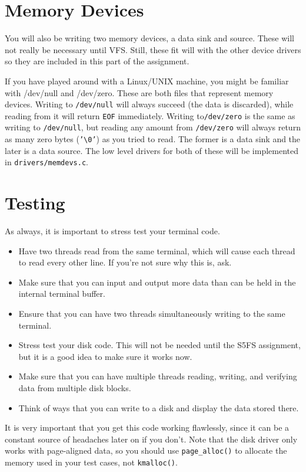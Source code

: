 \section{Memory Devices}
You will also be writing two memory devices, a data sink and source. These will not really be necessary until VFS. Still, these fit will with the other device drivers so they are included in this part of the assignment.

If you have played around with a Linux/UNIX machine, you might be familiar with /dev/null and /dev/zero. These are both files that represent memory devices. Writing to \texttt{/dev/null} will always succeed (the data is discarded), while reading from it will return \texttt{EOF} immediately. Writing to\texttt{/dev/zero} is the same as writing to \texttt{/dev/null}, but reading any amount from \texttt{/dev/zero} will always return as many zero bytes (\texttt{'\textbackslash0'}) as you tried to read. The former is a data sink and the later is a data source. The low level drivers for both of these will be implemented in \texttt{drivers/memdevs.c}. 

\section{Testing}
As always, it is important to stress test your terminal code.
\begin{itemize}
    \item Have two threads read from the same terminal, which will cause each thread to read every other line. If you're not sure why this is, ask.
    \item Make sure that you can input and output more data than can be held in the internal terminal buffer.
    \item Ensure that you can have two threads simultaneously writing to the same terminal.
    \item Stress test your disk code. This will not be needed until the S5FS assignment, but it is a good idea to make sure it works now.
    \item Make sure that you can have multiple threads reading, writing, and verifying data from multiple disk blocks.
    \item Think of ways that you can write to a disk and display the data stored there.
\end{itemize}
 It is very important that you get this code working flawlessly, since it can be a constant source of headaches later on if you don't. Note that the disk driver only works with page-aligned data, so you should use \texttt{page\_alloc()} to allocate the memory used in your test cases, not \texttt{kmalloc()}.

